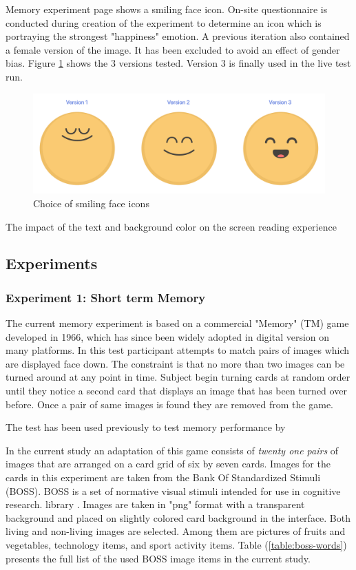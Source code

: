 	Memory experiment page shows a smiling face icon. On-site questionnaire is conducted during creation of the experiment to determine an icon which is portraying the strongest "happiness" emotion. A previous iteration also contained a female version of the image. It has been excluded to avoid an effect of gender bias. Figure \ref{fig:smiling-icons} shows the 3 versions tested. Version 3 is finally used in the live test run.
	
	\begin{figure}[h]
		\centering
		\includegraphics[width=0.7\linewidth]{graphics/smiling-icons}
		\caption{Choice of smiling face icons}
		\label{fig:smiling-icons}
	\end{figure}
	

	\cite{Zorko2017} The impact of the text and background color on the screen reading experience
	
	\clearpage
	\subsection{Experiments}

		\subsubsection{Experiment 1: Short term Memory} \label{sec:memory}
		
		The current memory experiment is based on a commercial "Memory" (TM) game developed in 1966, which has since been widely adopted in digital version on many platforms. 
		In this test participant attempts to match pairs of images which are displayed face down. 
		The constraint is that no more than two images can be turned around at any point in time. Subject begin turning cards at random order until they notice a second card that displays an image that has been turned over before. Once a pair of same images is found they are removed from the game.
		
		The test has been used previously to test memory performance by \cite{McBurney1997}
		
		In the current study an adaptation of this game consists of \textit{twenty one pairs} of images that are arranged on a card grid of six by seven cards. Images for the cards in this experiment are taken from the Bank Of Standardized Stimuli (BOSS). BOSS is a set of normative visual stimuli intended for use in cognitive research. library \cite{Brodeur2010}. Images are taken in "png" format with a transparent background and placed on slightly colored card background in the interface. Both living and non-living images are selected. Among them are pictures of fruits and vegetables, technology items, and sport activity items.
		Table (\ref{table:boss-words}) presents the full list of the used BOSS image items in the current study.
		
